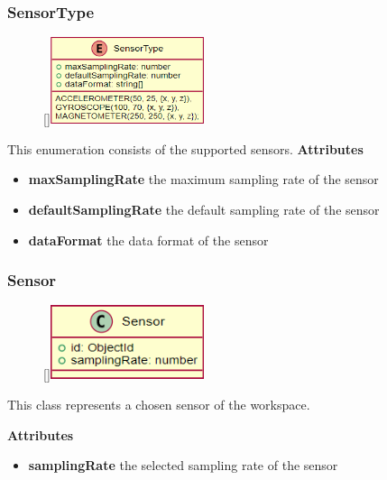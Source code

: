 \subsubsection{SensorType}
\begin{figure}
    \raisebox{0pt}[\dimexpr{}\baselineskip\relax]{\includegraphics[width=4.5cm]{classes/workspace-management/4.png}}
\end{figure} 
\par
This enumeration consists of the supported sensors.
\newline
\newline
\textbf{Attributes}
\begin{itemize}
    \item \textbf{maxSamplingRate} the maximum sampling rate of the sensor
    \item \textbf{defaultSamplingRate} the default sampling rate of the sensor
    \item \textbf{dataFormat} the data format of the sensor
\end{itemize}

\subsubsection{Sensor}
\begin{figure}
    \raisebox{0pt}[\dimexpr{}\baselineskip\relax]{\includegraphics[width=4.5cm]{classes/workspace-management/3.png}}
\end{figure} 
\par
This class represents a chosen sensor of the workspace. 
\newline
\newline

\textbf{Attributes}
\begin{itemize}
    \item \textbf{samplingRate} the selected sampling rate of the sensor
\end{itemize}

